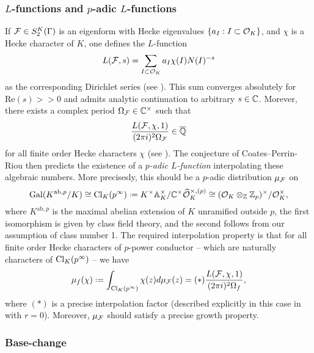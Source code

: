 \documentclass[a4paper,11pt]{article}
\numberwithin{equation}{section}
\begin{document}
\subsubsection{$L$-functions and $p$-adic $L$-functions}\label{sec:l-functions}
If $\mathcal{F} \in S_2^K(\Gamma)$ is an eigenform with Hecke eigenvalues $\{a_I : I\subset \mathcal{O}_K\}$, and $\chi$ is a Hecke character of $K$, one defines the $L$-function 
\[
	L(\mathcal{F},s) = \sum_{I \subset \mathcal{O}_K}a_I \chi(I)N(I)^{-s}
\] 
as the corresponding Dirichlet series (see \cite[\S1.2]{Wil17}). This sum converges absolutely for $\mathrm{Re}(s)>>0$ and admits analytic continuation to arbitrary $s\in\mathbb{C}$. Morever, there exists a complex period $\Omega_{\mathcal{F}} \in \mathbb{C}^\times$ such that
\begin{equation}\label{eqn:algebraic}
	\frac{L(\mathcal{F},\chi,1)}{(2\pi i)^2\Omega_{\mathcal{F}}} \in \overline{\mathbb{Q}}
\end{equation}
for all finite order Hecke characters $\chi$ (see \cite[\S8]{Hid94}). The conjecture of Coates--Perrin-Riou then predicts the existence of a \emph{$p$-adic $L$-function} interpolating these algebraic numbers. More precisesly, this should be a $p$-adic distribution $\mu_{\mathcal{F}}$ on 
\[
	\mathrm{Gal}(K^{\mathrm{ab},p}/K) \cong \cl_K(p^\infty) \defeq K^\times\A_K^\times/\C^\times \widehat{\roi}_K^{\times,(p)} \cong (\roi_K\otimes_{\Z}\Zp)^\times/\roi_K^\times,
\]
where $K^{\mathrm{ab},p}$ is the maximal abelian extension of $K$ unramified outside $p$, the first isomorphism is given by class field theory, and the second follows from our assumption of class number 1. The required interpolation property is that for all finite order Hecke characters of $p$-power conductor -- which are naturally characters of $\mathrm{Cl}_K(p^\infty)$ -- we have
\begin{equation}\label{eqn:interpolation}
	\mu_f(\chi) \defeq \int_{\cl_K(p^\infty)}\chi(z)d\mu_{\f}(z) = (*)\frac{L(\f,\chi,1)}{(2\pi i)^2\Omega_{f}},
\end{equation}
where $(*)$ is a precise interpolation factor (described explicitly in this case in \cite[Thm.~3.12]{BW17} with $r=0$). Moreover, $\mu_{\mathcal{F}}$ should satisfy a precise growth property. 


\subsubsection{Base-change}
\end{document}
